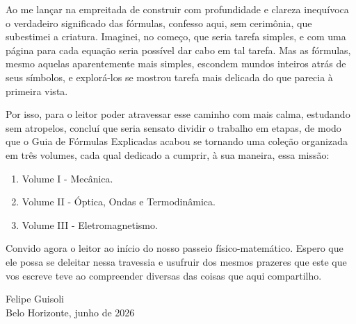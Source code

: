 
Ao me lançar na empreitada de construir com profundidade e clareza inequívoca o verdadeiro significado das fórmulas, confesso aqui, sem cerimônia, que subestimei a criatura. Imaginei, no começo, que seria tarefa simples, e com uma página para cada equação seria possível dar cabo em tal tarefa. Mas as fórmulas, mesmo aquelas aparentemente mais simples, escondem mundos inteiros atrás de seus símbolos, e explorá-los se mostrou tarefa mais delicada do que parecia à primeira vista.

Por isso, para o leitor poder atravessar esse caminho com mais calma, estudando sem atropelos, concluí que seria sensato dividir o trabalho em etapas, de modo que o Guia de Fórmulas Explicadas acabou se tornando uma coleção organizada em três volumes, cada qual dedicado a cumprir, à sua maneira, essa missão:

\begin{enumerate}
    \item Volume I - Mecânica.
    \item Volume II - Óptica, Ondas e Termodinâmica.
    \item Volume III - Eletromagnetismo.
\end{enumerate}


Convido agora o leitor ao início do nosso passeio físico-matemático. Espero que ele possa se deleitar nessa travessia e usufruir dos mesmos prazeres que este que vos escreve teve ao compreender diversas das coisas que aqui compartilho.





\begin{flushright}
Felipe Guisoli\\
Belo Horizonte, junho de 2026
\end{flushright}